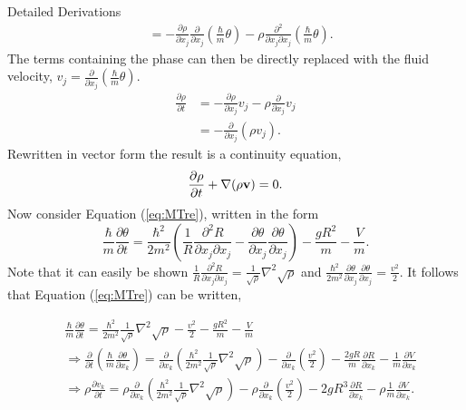 \begin{chapter}{Detailed Derivations\label{app:App2}}
\begin{align*}
  &= -\frac{\partial \rho}{\partial x_j}\frac{\partial}{\partial x_j}\left( \frac{\hbar}{m} \theta \right) - \rho \frac{\partial^2}{\partial x_j \partial x_j}\left(\frac{\hbar}{m}\theta \right).
\end{align*}
The terms containing the phase can then be directly replaced with the fluid velocity, $v_j = \frac{\partial}{\partial x_j}\left( \frac{\hbar}{m} \theta \right)$.
\begin{align*}
  \frac{\partial \rho}{\partial t} &= -\frac{\partial \rho}{\partial x_j} v_j - \rho \frac{\partial}{\partial x_j} v_j\\
                   &= -\frac{\partial}{\partial x_j} \left( \rho v_j \right).
\end{align*}
Rewritten in vector form the result is a continuity equation,
\begin{equation}
  \frac{\partial \rho}{\partial t} + \nabla(\rho{\bf v}) = 0.
\end{equation}
Now consider Equation (\ref{eq:MTre}), written in the form
\begin{equation*}
\frac{\hbar}{m} \frac{\partial \theta}{\partial t} = \frac{\hbar^2}{2m^2} \left( \frac{1}{R} \frac{\partial^2 R}{\partial x_j \partial x_j} - \frac{\partial \theta}{\partial x_j}\frac{\partial \theta}{\partial x_j}  \right) - \frac{gR^2}{m} - \frac{V}{m}.
\end{equation*}
Note that it can easily be shown $\frac{1}{R} \frac{\partial^2 R}{\partial x_j \partial x_j} = \frac{1}{\sqrt{\rho}}\nabla^2\sqrt{\rho}$ and $\frac{\hbar^2}{2m^2} \frac{\partial \theta}{\partial x_j}\frac{\partial \theta}{\partial x_j} = \frac{v^2}{2} $. It follows that Equation (\ref{eq:MTre}) can be written,

\begin{align*}
&\frac{\hbar}{m} \frac{\partial \theta}{\partial t} = \frac{\hbar^2}{2m^2} \frac{1}{\sqrt{\rho}} \nabla^2\sqrt{\rho} - \frac{v^2}{2} - \frac{gR^2}{m} - \frac{V}{m}\\
&\Rightarrow \frac{\partial}{\partial t}\left(\frac{\hbar}{m} \frac{\partial \theta}{\partial x_k}\right) = \frac{\partial}{\partial x_k}\left(\frac{\hbar^2}{2m^2} \frac{1}{\sqrt{\rho}} \nabla^2\sqrt{\rho} \right)- \frac{\partial}{\partial x_k} \left (\frac{v^2}{2}\right) - \frac{2gR}{m}\frac{\partial R}{\partial x_k} - \frac{1}{m}\frac{\partial V}{\partial x_k}\\
&\Rightarrow \rho\frac{\partial v_k}{\partial t} =\rho \frac{\partial}{\partial x_k}\left(\frac{\hbar^2}{2m^2} \frac{1}{\sqrt{\rho}} \nabla^2\sqrt{\rho} \right)- \rho\frac{\partial}{\partial x_k} \left (\frac{v^2}{2}\right) - 2gR^3\frac{\partial R}{\partial x_k} - \rho\frac{1}{m}\frac{\partial V}{\partial x_k}.
\end{align*}


\end{chapter}
